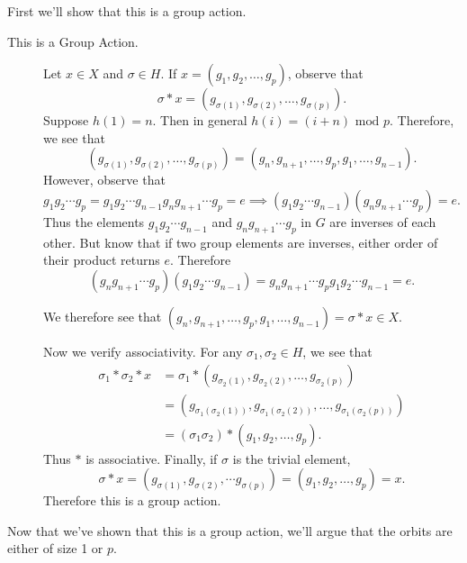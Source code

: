 \documentclass[12pt,letterpaper]{algebra_book}
\theoremstyle{definition}
\begin{document}
\begin{prf}
        \textcolor{NavyBlue}{First we'll show that this is a group action.}
        \begin{description}
            \item[This is a Group Action.] 
                Let $x \in X$ and $\sigma \in H$. If $x = (g_1, g_2,
                \dots , g_p)$, observe that 
                \[
                    \sigma * x = (g_{\sigma(1)}, g_{\sigma(2)}, \dots, g_{\sigma(p)}).
                \]
                Suppose $h(1) = n$. Then in general $h(i) = (i + n)
                \mbox{ mod }p.$ Therefore, we see that 
                \[
                    (g_{\sigma(1)}, g_{\sigma(2)}, \dots, g_{\sigma(p)}) 
                    = 
                    (g_{n}, g_{n+1}, \dots, g_p, g_1, \dots, g_{n-1}).
                \]
                However, observe that 
                \[
                    g_1g_2\cdots g_p = g_1g_2 \cdots g_{n-1}g_n g_{n+1} \cdots g_p = e
                    \implies (g_1g_2 \cdots g_{n-1})(g_n g_{n+1} \cdots g_p) = e.
                \]
                Thus the elements $g_1g_2 \cdots g_{n-1}$ and $g_n
                g_{n+1} \cdots g_p$ in $G$ are inverses of each other. But
                know that if two group elements are inverses, either order
                of their product returns $e$. Therefore 
                \[
                    (g_ng_{n+1} \cdots g_{p})(g_1g_2 \cdots g_{n-1}) 
                    = g_ng_{n+1} \cdots g_{p}g_1g_2 \cdots g_{n-1} = e.
                \]
                                
                We therefore see that
                $(g_{n}, g_{n+1}, \dots, g_p,
                g_1, \dots, g_{n-1}) = \sigma *x \in X$. 

                Now we verify associativity. For any $\sigma_1,
                \sigma_2 \in H$, we see that 
                \begin{align*}
                    \sigma_1 * \sigma_2*x &= \sigma_1 * (g_{\sigma_2(1)}, g_{\sigma_2(2)}, \dots, g_{\sigma_2(p)})\\
                    &= (g_{\sigma_1(\sigma_2(1))}, g_{\sigma_1(\sigma_2(2))}, \dots, g_{\sigma_1(\sigma_2(p))})\\
                    &= (\sigma_1 \sigma_2) * (g_1, g_2, \dots, g_p).
                \end{align*}
                Thus $*$ is associative. Finally, if $\sigma$ is the
                trivial element, 
                \[
                    \sigma * x = (g_{\sigma(1)}, g_{\sigma(2)}, \cdots g_{\sigma(p)}) = (g_1, g_2, \dots, g_p) = x.
                \]
                Therefore this is a group action.
        \end{description}
        \textcolor{NavyBlue}{Now that we've shown that this is a group
        action, we'll argue that the orbits are either of size 1 or
        $p$.}
        

\end{prf}
\end{document}
